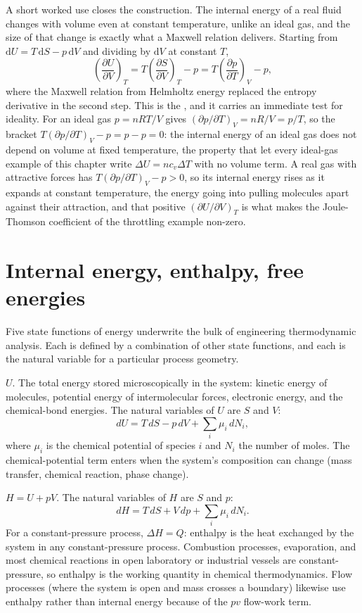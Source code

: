 A short worked use closes the construction. The internal energy of a real
fluid changes with volume even at constant temperature, unlike an ideal gas,
and the size of that change is exactly what a Maxwell relation delivers.
Starting from $\mathrm{d}U = T\,\mathrm{d}S - p\,\mathrm{d}V$ and dividing by
$\mathrm{d}V$ at constant $T$,
\[
\left(\frac{\partial U}{\partial V}\right)_T =
T\left(\frac{\partial S}{\partial V}\right)_T - p
= T\left(\frac{\partial p}{\partial T}\right)_V - p,
\]
where the Maxwell relation from Helmholtz energy replaced the entropy
derivative in the second step. This is the , and it carries an immediate test for ideality. For an ideal gas
$p = nRT/V$ gives $(\partial p/\partial T)_V = nR/V = p/T$, so the bracket
$T(\partial p/\partial T)_V - p = p - p = 0$: the internal energy of an ideal
gas does not depend on volume at fixed temperature, the property that let
every ideal-gas example of this chapter write $\Delta U = nc_v\Delta T$ with
no volume term. A real gas with attractive forces has $T(\partial p/\partial
T)_V - p > 0$, so its internal energy rises as it expands at constant
temperature, the energy going into pulling molecules apart against their
attraction, and that positive $(\partial U/\partial V)_T$ is what makes the
Joule-Thomson coefficient of the throttling example non-zero.

\section{Internal energy, enthalpy, free energies}

Five state functions of energy underwrite the bulk of engineering
thermodynamic analysis. Each is defined by a combination of other
state functions, and each is the natural variable for a particular
process geometry.

 $U$. The total energy stored microscopically
in the system: kinetic energy of molecules, potential energy of
intermolecular forces, electronic energy, and the chemical-bond
energies. The natural variables of $U$ are $S$ and $V$:
\[
dU = T \,dS - p \,dV + \sum_i \mu_i \,dN_i,
\]
where $\mu_i$ is the chemical potential of species $i$ and $N_i$ the
number of moles. The chemical-potential term enters when the system's
composition can change (mass transfer, chemical reaction, phase
change).

 $H = U + pV$. The natural variables of $H$ are $S$
and $p$:
\[
dH = T \,dS + V \,dp + \sum_i \mu_i \,dN_i.
\]
For a constant-pressure process, $\Delta H = Q$: enthalpy is the heat
exchanged by the system in any constant-pressure process. Combustion
processes, evaporation, and most chemical reactions in open laboratory
or industrial vessels are constant-pressure, so enthalpy is the
working quantity in chemical thermodynamics. Flow processes (where the
system is open and mass crosses a boundary) likewise use enthalpy
rather than internal energy because of the $pv$ flow-work term.

